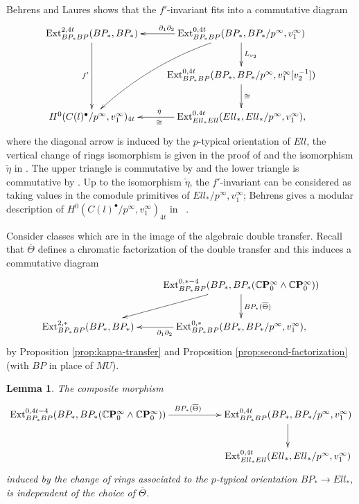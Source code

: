 \documentclass[10pt,a4paper]{amsart}
\newtheorem{lem}[thm]{Lemma}
\theoremstyle{definition}
\theoremstyle{remark}
\newcommand{\ext}{\mathrm{Ext}}
\newcommand{\tmf}{{Ell}}
\newcommand{\tmfcoeff}{{Ell}}
\newcommand{\cp}{\mathbb{C} \mathbf{P}^\infty}
\renewcommand{\smash}{\wedge}
\begin{document}
Behrens and Laures shows that the $f'$-invariant fits into a commutative diagram
\begin{eqnarray}
	\label{eqn:f'_invariant}
	\xymatrix{
\ext^{2,4t}_{BP_*BP} (BP_*, BP_*)
\ar[dd]_{f'}
&
\ext^{0,4t}_{BP_*BP} (BP_*, BP_*/p^\infty,v_1^\infty)
\ar[l]_{\partial_1\partial_2}
\ar[d]^{L_{v_2}}
\ar@/_1pc/[ldd]
\\
&\ext^{0,4t}_{BP_*BP} (BP_*, BP_*/p^\infty,v_1^\infty [v_2^{-1}])
\ar[d]^\cong
\\
H^0(C (l)^\bullet/p^\infty, v_1 ^\infty )_{4t}
&
\ext^{0,4t}_{\tmfcoeff_*\tmfcoeff} (\tmfcoeff_*, \tmfcoeff_*/p^\infty,v_1^\infty),
\ar[l]^(.55){\cong}_(.55){\tilde{\eta}}
	}
\end{eqnarray}
where the diagonal arrow is induced  by the $p$-typical orientation of $\tmf$,  the vertical change of rings isomorphism is given in the proof of
\cite[Lemma 4.6]{behrens_laures} and the  isomorphism $\tilde{\eta}$ in \cite[Proposition 3.17]{behrens_laures}.  The upper triangle is commutative by
\cite[Diagram 3.15]{behrens_laures} and the lower triangle is commutative by \cite[Diagram 3.16]{behrens_laures}. Up to the isomorphism $\tilde{\eta}$, the $f'$-invariant can be considered
as taking values in the comodule primitives of $\tmfcoeff_*/p^\infty,v_1^\infty$; Behrens gives a modular description of $H^0(C (l)^\bullet/p^\infty, v_1 ^\infty )_{4t}$
 in  \cite[Theorems 1.2, 1.3]{behrens}.


Consider classes which are in the image of the algebraic double transfer. Recall that $\overline{\Theta}$ defines a chromatic factorization of the double transfer and this
induces a commutative diagram
\begin{eqnarray}
	\label{eqn:alg_double_transfer}
\xymatrix{
&
\ext_{BP_*BP}^{0,*-4} (BP_* , BP_* (\cp_0\smash \cp_0))
\ar[d]^{BP_* (\overline{\Theta})}
\ar[ld]
\\
\ext^{2,*}_{BP_* BP} (BP_* , BP_*)
&
\ext^{0,*}_{BP_* BP} (BP_* , BP_* /p^\infty, v_1^\infty)
\ar[l]^{\partial_1 \partial_2},
}
\end{eqnarray}
by Proposition \ref{prop:kappa-transfer} and Proposition \ref{prop:second-factorization} (with  $BP$ in place of $MU$).

\begin{lem}
\label{lem:independence_Theta}
	The composite morphism
	\[
		\xymatrix{
\ext_{BP_*BP}^{0,4t -4} (BP_* , BP_* (\cp_0\smash \cp_0) )
\ar[rr]^{BP_* (\overline{\Theta})}
&&
\ext^{0,4t}_{BP_* BP} (BP_* , BP_* /p^\infty, v_1^\infty)
\ar[d]
\\
&&
\ext^{0,4t}_{\tmfcoeff_*\tmfcoeff} (\tmfcoeff_*, \tmfcoeff_*/p^\infty,v_1^\infty)
}
	\]
induced by the change of rings associated to the $p$-typical orientation $BP_* \rightarrow \tmfcoeff_*$, is independent of the choice of $\overline{\Theta}$.
\end{lem}
\end{document}
